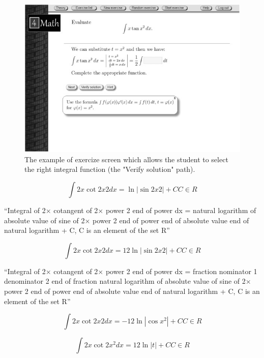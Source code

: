 \documentclass[12pt,1p]{elsarticle}
\begin{document}
\begin{figure}[t]
\centering
\includegraphics[width=5in]{./pics/3}
\caption{The example of exercize screen which allows the student to select the right integral function (the "Verify solution" path).}
\label{fig03}
\end{figure}

\begin{equation}
\label{eq1}
\int 2x \cot 2x2 dx = \ln | \sin 2x2 | + CC \in R
\end{equation}
	
	“Integral of 2× cotangent of 2× power 2 end of power dx = natural logarithm of absolute value of sine of 2× power 2 end of power end of absolute value end of natural logarithm + C, C is an element of the set R”

\begin{equation}
\label{eq2}
\int 2x \cot 2x2 dx = 12 \ln | \sin 2x2 | + CC \in R
\end{equation}
	
	“Integral of 2× cotangent of 2× power 2 end of power dx = fraction nominator 1 denominator 2 end of fraction natural logarithm of absolute value of sine of 2× power 2 end of power end of absolute value end of natural logarithm + C, C is an element of the set R”

\begin{equation}
\label{eq3}
\int 2x \cot 2x2 dx = -12 \ln | \cos x^2 | + CC \in R
\end{equation}

\begin{equation}
\label{eq4}
\int 2x \cot 2x^2 dx = 12 \ln | t | + CC \in R
\end{equation}
\end{document}
